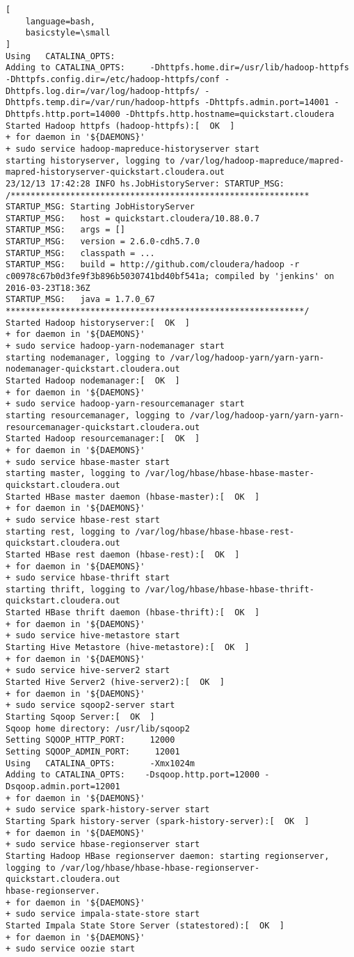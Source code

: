 \documentclass[a4paper]{article}
\begin{document}
\begin{lstlisting}[
    language=bash,
    basicstyle=\small
]
Using   CATALINA_OPTS:
Adding to CATALINA_OPTS:     -Dhttpfs.home.dir=/usr/lib/hadoop-httpfs -Dhttpfs.config.dir=/etc/hadoop-httpfs/conf -Dhttpfs.log.dir=/var/log/hadoop-httpfs/ -Dhttpfs.temp.dir=/var/run/hadoop-httpfs -Dhttpfs.admin.port=14001 -Dhttpfs.http.port=14000 -Dhttpfs.http.hostname=quickstart.cloudera
Started Hadoop httpfs (hadoop-httpfs):[  OK  ]
+ for daemon in '${DAEMONS}'
+ sudo service hadoop-mapreduce-historyserver start
starting historyserver, logging to /var/log/hadoop-mapreduce/mapred-mapred-historyserver-quickstart.cloudera.out
23/12/13 17:42:28 INFO hs.JobHistoryServer: STARTUP_MSG:
/************************************************************
STARTUP_MSG: Starting JobHistoryServer
STARTUP_MSG:   host = quickstart.cloudera/10.88.0.7
STARTUP_MSG:   args = []
STARTUP_MSG:   version = 2.6.0-cdh5.7.0
STARTUP_MSG:   classpath = ...
STARTUP_MSG:   build = http://github.com/cloudera/hadoop -r c00978c67b0d3fe9f3b896b5030741bd40bf541a; compiled by 'jenkins' on 2016-03-23T18:36Z
STARTUP_MSG:   java = 1.7.0_67
************************************************************/
Started Hadoop historyserver:[  OK  ]
+ for daemon in '${DAEMONS}'
+ sudo service hadoop-yarn-nodemanager start
starting nodemanager, logging to /var/log/hadoop-yarn/yarn-yarn-nodemanager-quickstart.cloudera.out
Started Hadoop nodemanager:[  OK  ]
+ for daemon in '${DAEMONS}'
+ sudo service hadoop-yarn-resourcemanager start
starting resourcemanager, logging to /var/log/hadoop-yarn/yarn-yarn-resourcemanager-quickstart.cloudera.out
Started Hadoop resourcemanager:[  OK  ]
+ for daemon in '${DAEMONS}'
+ sudo service hbase-master start
starting master, logging to /var/log/hbase/hbase-hbase-master-quickstart.cloudera.out
Started HBase master daemon (hbase-master):[  OK  ]
+ for daemon in '${DAEMONS}'
+ sudo service hbase-rest start
starting rest, logging to /var/log/hbase/hbase-hbase-rest-quickstart.cloudera.out
Started HBase rest daemon (hbase-rest):[  OK  ]
+ for daemon in '${DAEMONS}'
+ sudo service hbase-thrift start
starting thrift, logging to /var/log/hbase/hbase-hbase-thrift-quickstart.cloudera.out
Started HBase thrift daemon (hbase-thrift):[  OK  ]
+ for daemon in '${DAEMONS}'
+ sudo service hive-metastore start
Starting Hive Metastore (hive-metastore):[  OK  ]
+ for daemon in '${DAEMONS}'
+ sudo service hive-server2 start
Started Hive Server2 (hive-server2):[  OK  ]
+ for daemon in '${DAEMONS}'
+ sudo service sqoop2-server start
Starting Sqoop Server:[  OK  ]
Sqoop home directory: /usr/lib/sqoop2
Setting SQOOP_HTTP_PORT:     12000
Setting SQOOP_ADMIN_PORT:     12001
Using   CATALINA_OPTS:       -Xmx1024m
Adding to CATALINA_OPTS:    -Dsqoop.http.port=12000 -Dsqoop.admin.port=12001
+ for daemon in '${DAEMONS}'
+ sudo service spark-history-server start
Starting Spark history-server (spark-history-server):[  OK  ]
+ for daemon in '${DAEMONS}'
+ sudo service hbase-regionserver start
Starting Hadoop HBase regionserver daemon: starting regionserver, logging to /var/log/hbase/hbase-hbase-regionserver-quickstart.cloudera.out
hbase-regionserver.
+ for daemon in '${DAEMONS}'
+ sudo service impala-state-store start
Started Impala State Store Server (statestored):[  OK  ]
+ for daemon in '${DAEMONS}'
+ sudo service oozie start


\end{lstlisting}
\end{document}
